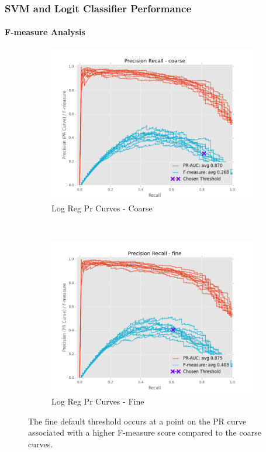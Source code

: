 \documentclass{beamer}
\begin{document}
\begin{frame}
    \frametitle{SVM and Logit Classifier Performance}
    \framesubtitle{F-measure Analysis}
    \begin{figure}[!htb]
        \centering
        \begin{subfigure}[t]{0.475\textwidth}
            \centering
            \includegraphics[width=\textwidth]{fig/LogReg_FindThreshold_PrCurve_coarse}
            \caption{Log Reg Pr Curves - Coarse}
        \end{subfigure}
        ~
        \begin{subfigure}[t]{0.475\textwidth}
            \centering
            \includegraphics[width=\textwidth]{fig/LogReg_FindThreshold_PrCurve_fine}
            \caption{Log Reg Pr Curves - Fine}
        \end{subfigure}
        \caption{The fine default threshold occurs at a point on the PR curve associated with a higher
        F-measure score compared to the coarse curves.}
        \label{fig:LogRegThreshPr}
    \end{figure}
\end{frame}
\end{document}
